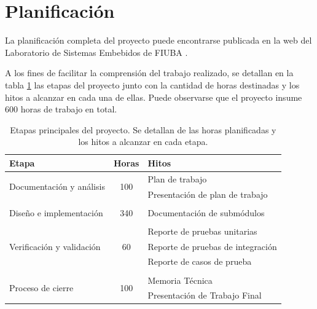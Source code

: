 \section{Planificación}
\label{sec:plan}

La planificación completa del proyecto puede encontrarse publicada en la web del Laboratorio de Sistemas Embebidos de FIUBA \citep{plan}.

A los fines de facilitar la comprensión del trabajo realizado, se detallan en la tabla \ref{tab:planificacion} las etapas del proyecto junto con la cantidad de horas destinadas y los hitos a alcanzar en cada una de ellas.  Puede observarse que el proyecto insume 600 horas de trabajo en total.

\vspace{20px}

\begin{table}[ht]
\centering
\caption[Etapas principales del proyecto]{Etapas principales del proyecto. Se detallan de las horas planificadas y los hitos a alcanzar en cada etapa.}
\label{tab:planificacion}
\begin{tabular}{lcl}
\toprule
\textbf{Etapa}                            & \textbf{Horas}       & \textbf{Hitos}                                \\ \midrule
\multirow{2}{*}{Documentación y análisis} & \multirow{2}{*}{100} & Plan de trabajo                             \\
                                          &                      & Presentación de plan de trabajo \vspace{5px}\\
                                          & \multicolumn{1}{l}{} &                                             \\ 
Diseño e implementación                   & 340                  & Documentación de submódulos  \vspace{5px}   \\
                                          & \multicolumn{1}{l}{} &                                             \\ 
               							  &                      & Reporte de pruebas unitarias                \\
Verificación y validación                 & 60                   & Reporte de pruebas de integración           \\
                                          &                      & Reporte de casos de prueba   \vspace{5px}   \\
                                          & \multicolumn{1}{l}{} &                                             \\ 
\multirow{2}{*}{Proceso de cierre}        & \multirow{2}{*}{100} & Memoria Técnica                             \\
                                          &                      & Presentación de Trabajo Final               \\ \bottomrule
\end{tabular}
\end{table}

